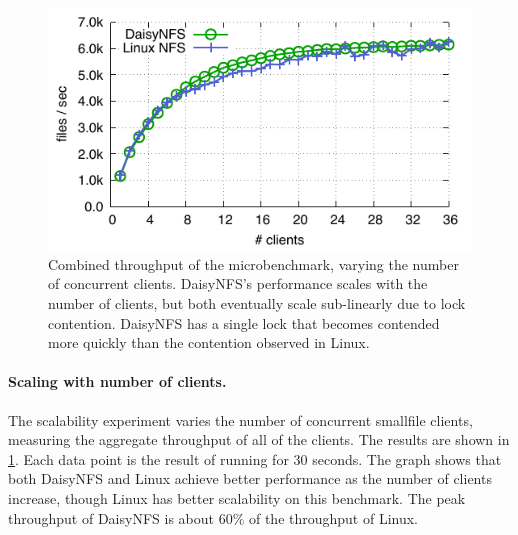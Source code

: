 \begin{figure}[ht]
  \centering
  \includegraphics{daisy-nfs/fig/scale.pdf}
  \vspace{0.5\baselineskip}
  \caption[Concurrent smallfile performance]%
  {Combined throughput of the  microbenchmark, varying the number
    of concurrent clients. DaisyNFS's performance scales with the number of
    clients, but both eventually scale sub-linearly due to lock contention. DaisyNFS has a single lock that becomes contended more quickly than the contention observed in Linux.}
  \label{fig:eval:scale}
\end{figure}


\paragraph{Scaling with number of clients.}

The scalability experiment varies the number of concurrent smallfile clients,
measuring the aggregate throughput of all of the clients. The results are shown in \cref{fig:eval:scale}. Each data point is the
result of running for 30 seconds. The graph shows that both DaisyNFS and Linux
achieve better performance as the number of clients increase, though Linux has
better scalability on this benchmark. The peak throughput of DaisyNFS is about
60\% of the throughput of Linux.

